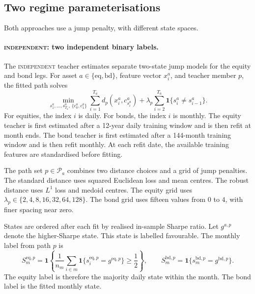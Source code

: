 \documentclass[10pt]{article}
\newcommand{\Path}{\mathcal{P}}
\newcommand{\Bindep}{\textsc{independent}}
\begin{document}
\subsection{Two regime parameterisations}
\label{sec:two-parameterisations}

Both approaches use a jump penalty, with different state spaces.

\paragraph{\Bindep{}: two independent binary labels.}
The \Bindep{} teacher estimates separate two-state jump models for the equity and bond legs.
For asset \(a\in\{\mathrm{eq},\mathrm{bd}\}\), feature vector \(x^a_i\), and teacher member
\(p\), the fitted path solves
\begin{equation}
\min_{s^a_1,\dots,s^a_{T_a},\,\{c^a_0,c^a_1\}}
\sum_{i=1}^{T_a} d_p\!\left(x^a_i,c^a_{s^a_i}\right)
+\lambda_p\sum_{i=2}^{T_a}\mathbf{1}\{s^a_i\neq s^a_{i-1}\}.
\label{eq:independent-teacher}
\end{equation}
For equities, the index \(i\) is daily. For bonds, the index \(i\) is monthly. The equity
teacher is first estimated after a 12-year daily training window and is then refit at month
ends. The bond teacher is first estimated after a 144-month training window and is then refit
monthly. At each refit date, the available training features are standardised before fitting.

The path set \(p\in\Path_a\) combines two distance choices and a grid of jump penalties. The
standard distance uses squared Euclidean loss and mean centres. The robust distance uses
\(L^1\) loss and medoid centres. The equity grid uses
\(\lambda_p\in\{2,4,8,16,32,64,128\}\). The bond grid uses fifteen values from \(0\) to
\(4\), with finer spacing near zero.

States are ordered after each fit by realised in-sample Sharpe ratio. Let \(g^{a,p}\) denote
the higher-Sharpe state. This state is labelled favourable. The monthly label
from path \(p\) is
\begin{equation}
S^{\mathrm{eq},p}_m
=
\mathbf{1}\!\left\{
\frac{1}{n_m}\sum_{i\in m}\mathbf{1}\{s^{\mathrm{eq},p}_i=g^{\mathrm{eq},p}\}
\ge \frac{1}{2}
\right\},
\qquad
S^{\mathrm{bd},p}_m
=
\mathbf{1}\{s^{\mathrm{bd},p}_m=g^{\mathrm{bd},p}\}.
\label{eq:independent-monthly-label}
\end{equation}
The equity label is therefore the majority daily state within the month. The bond label is
the fitted monthly state.
\end{document}

